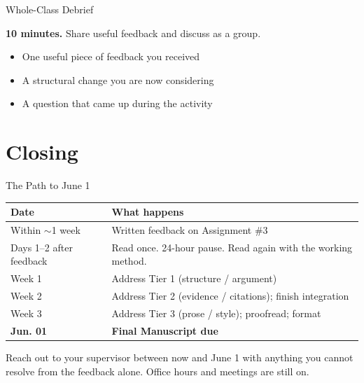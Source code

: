 \documentclass[aspectratio=169,11pt]{beamer}
\begin{document}
\begin{frame}{Whole-Class Debrief}
    \large
    \vspace{0.4cm}
    \begin{center}
        \textbf{10 minutes.} Share useful feedback and discuss as a group.
    \end{center}
    \vspace{0.6cm}
    \begin{itemize}
        \setlength{\itemsep}{0.35cm}
        \item One useful piece of feedback you received
        \item A structural change you are now considering
        \item A question that came up during the activity
    \end{itemize}
\end{frame}

\section{Closing}

\begin{frame}{The Path to June 1}
    \begin{table}
        \small
        \begin{tabular}{ll}
            \toprule
            \textbf{Date} & \textbf{What happens} \\
            \midrule
            Within $\sim$1 week & Written feedback on Assignment \#3 \\
            Days 1--2 after feedback & Read once. 24-hour pause. Read again with the working method. \\
            Week 1 & Address Tier 1 (structure / argument) \\
            Week 2 & Address Tier 2 (evidence / citations); finish integration \\
            Week 3 & Address Tier 3 (prose / style); proofread; format \\
            \textbf{Jun. 01} & \textbf{Final Manuscript due} \\
            \bottomrule
        \end{tabular}
    \end{table}
    \vspace{0.3cm}
    Reach out to your supervisor between now and June 1 with anything you cannot resolve from the feedback alone. Office hours and meetings are still on.
\end{frame}
\end{document}
